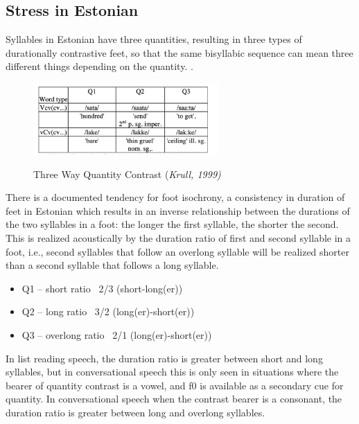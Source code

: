 \documentclass[11pt]{article}
\begin{document}
\subsection*{Stress in Estonian}

Syllables in Estonian have three quantities, resulting in three types of durationally contrastive feet, so that the same bisyllabic sequence can mean three different things depending on the quantity. \cite{rossTimingEstonianFolk1998}.
 \begin{figure}[htbp]
 \begin{center}
 \includegraphics[width=200pt]{figures/Quantity.png}\\

 \caption{Three Way Quantity Contrast {(\it Krull, 1999)}}
 \label{quant_cont}
 \end{center}
 \end{figure}
 
 There is a documented tendency for foot isochrony, a consistency in duration of feet in Estonian which results in an inverse relationship between the durations of the two syllables in a foot: the longer the first syllable, the shorter the second. This is realized acoustically by the duration ratio of first and second syllable in a foot, i.e., second syllables that follow an overlong syllable will be realized shorter than a second syllable that follows a long syllable. \\
 \begin{itemize}
 	\item Q1 – short 		ratio ~2/3	(short-long(er))
	\item Q2 – long		ratio ~3/2	(long(er)-short(er))
	\item Q3 – overlong		ratio ~2/1 	(long(er)-short(er)) 
\end{itemize}
 
  In list reading speech, the duration ratio is greater between short and long syllables, but in conversational speech this is only seen in situations where the bearer of quantity contrast is a vowel, and f0 is available as a secondary cue for quantity. In conversational speech when the contrast bearer is a consonant, the duration ratio is greater between long and overlong syllables. 
 \\
\end{document}

